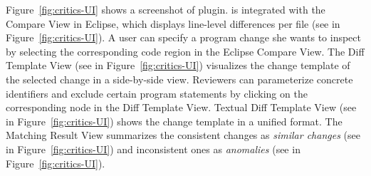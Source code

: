 Figure~\ref{fig:critics-UI} shows a screenshot of {\critics} plugin. {\critics} is integrated with the {Compare View} in Eclipse, which displays line-level differences per file (see  in Figure~\ref{fig:critics-UI}). A user can specify a program change she wants to inspect by selecting the corresponding code region in the Eclipse Compare View. The {Diff Template View} (see  in Figure~\ref{fig:critics-UI}) visualizes the change template of the selected change in a side-by-side view. Reviewers can parameterize concrete identifiers and exclude certain program statements by clicking on the corresponding node in the Diff Template View. {Textual Diff Template View} (see  in Figure~\ref{fig:critics-UI}) shows the change template in a unified format. The {Matching Result View} summarizes the consistent changes as {\em similar changes} (see  in Figure~\ref{fig:critics-UI}) and inconsistent ones as {\em anomalies} (see  in Figure~\ref{fig:critics-UI}).
